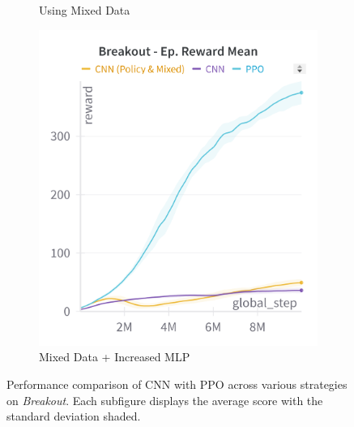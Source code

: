 \begin{figure}[ht]
\begin{subfigure}[b]{0.32\textwidth}
        \caption{Using Mixed Data}
        \label{fig:breakout_cnn_mixed}
    \end{subfigure}
    \hfill
    \begin{subfigure}[b]{0.32\textwidth}
        \centering
        \includegraphics[width=\textwidth]{images/breakout_cnn_policy_mixed}
        \caption{Mixed Data + Increased MLP}
        \label{fig:breakout_cnn_expert_policy}
    \end{subfigure}
    \caption{Performance comparison of CNN with PPO across various strategies on \textit{Breakout}. Each subfigure displays the average score with the standard deviation shaded.}
    \label{fig:breakout_cnn_study}
\end{figure}

